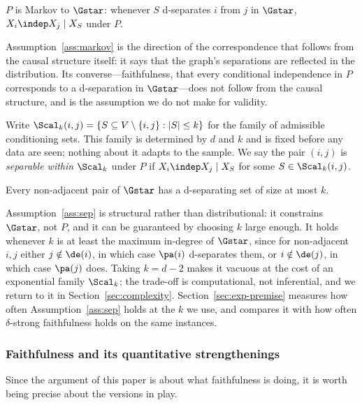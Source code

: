 \begin{assumption}\label{ass:markov}
$P$ is Markov to $\Gstar$: whenever $S$ d-separates $i$ from $j$ in $\Gstar$,
$X_i \indep X_j \mid X_S$ under $P$.
\end{assumption}

Assumption~\ref{ass:markov} is the direction of the correspondence that
follows from the causal structure itself: it says that the graph's separations
are reflected in the distribution. Its converse---faithfulness, that every
conditional independence in $P$ corresponds to a d-separation in
$\Gstar$---does not follow from the causal structure, and is the assumption we
do not make for validity.

Write $\Scal_k(i,j) = \{ S \subseteq V \setminus \{i,j\} : |S| \le k \}$ for
the family of admissible conditioning sets. This family is determined by $d$
and $k$ and is fixed before any data are seen; nothing about it adapts to the
sample. We say the pair $(i,j)$ is \emph{separable within $\Scal_k$} under $P$
if $X_i \indep X_j \mid X_S$ for some $S \in \Scal_k(i,j)$.

\begin{assumption}\label{ass:sep}
Every non-adjacent pair of $\Gstar$ has a d-separating set of size at most
$k$.
\end{assumption}

Assumption~\ref{ass:sep} is structural rather than distributional: it
constrains $\Gstar$, not $P$, and it can be guaranteed by choosing $k$ large
enough. It holds whenever $k$ is at least the maximum in-degree of $\Gstar$,
since for non-adjacent $i,j$ either $j \notin \de(i)$, in which case $\pa(i)$
d-separates them, or $i \notin \de(j)$, in which case $\pa(j)$ does. Taking
$k = d-2$ makes it vacuous at the cost of an exponential family $\Scal_k$; the
trade-off is computational, not inferential, and we return to it in
Section~\ref{sec:complexity}. Section~\ref{sec:exp-premise} measures how often
Assumption~\ref{ass:sep} holds at the $k$ we use, and compares it with how
often $\delta$-strong faithfulness holds on the same instances.

\subsubsection{Faithfulness and its quantitative strengthenings}
\label{sec:faithfulness}

Since the argument of this paper is about what faithfulness is doing, it is
worth being precise about the versions in play.

